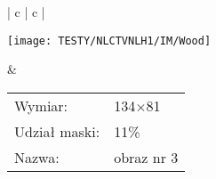 \documentclass[a4paper,12pt,twoside,openany]{report}
\begin{document}
\begin{longtable}[h!]{| c | c |}
    \begin{minipage}{.65\textwidth}
    \vspace{0.2cm}
    \centering
    \texttt{[image: TESTY/NLCTVNLH1/IM/Wood]}
    \vspace{0.2cm}
    \end{minipage}
    &
    \begin{minipage}{.35\textwidth}
    \begin{tabular}{l l}
	Wymiar: & 134$\times$81 \\
	Udział maski: & 11\% \\
	Nazwa: & obraz nr 3
	\end{tabular}
    \end{minipage} \\ \hline
  \caption{Dodatkowa grupa obrazów testowych dla nielokalnego modelu $NLCTV$.}
  \label{NLCTVVSNLHIIM}
\end{longtable}
\end{document}

